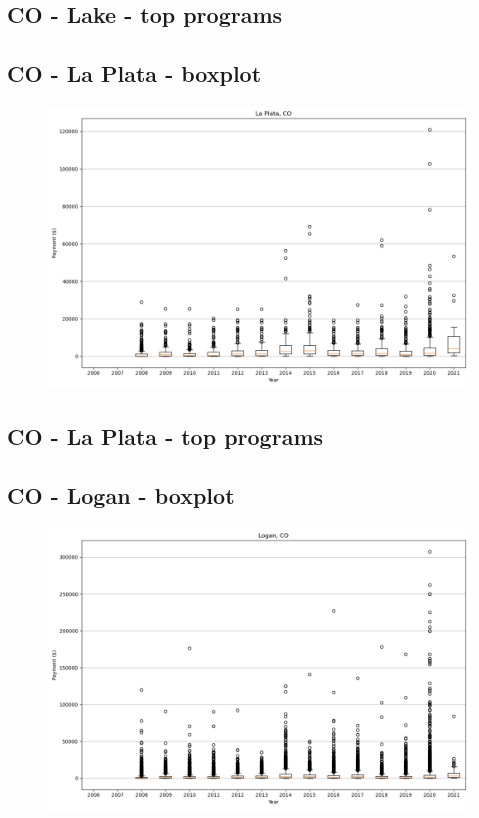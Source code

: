 \subsection*{CO - Lake - top programs}

\newpage
\subsection*{CO - La Plata - boxplot}
\begin{figure}[h]
\centering
\includegraphics[width=7in]{../output/boxplots/counties/La Plata-CO_boxplot.png}
\end{figure}


\subsection*{CO - La Plata - top programs}

\newpage
\subsection*{CO - Logan - boxplot}
\begin{figure}[h]
\centering
\includegraphics[width=7in]{../output/boxplots/counties/Logan-CO_boxplot.png}
\end{figure}


